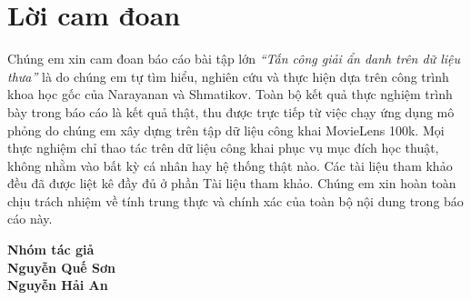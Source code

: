 \clearpage
{}
{}
\chapter*{Lời cam đoan}

Chúng em xin cam đoan báo cáo bài tập lớn \textit{``Tấn công giải ẩn danh trên dữ liệu thưa''} là do chúng em tự tìm hiểu, nghiên cứu và thực hiện dựa trên công trình khoa học gốc của Narayanan và Shmatikov. Toàn bộ kết quả thực nghiệm trình bày trong báo cáo là kết quả thật, thu được trực tiếp từ việc chạy ứng dụng mô phỏng do chúng em xây dựng trên tập dữ liệu công khai MovieLens 100k. Mọi thực nghiệm chỉ thao tác trên dữ liệu công khai phục vụ mục đích học thuật, không nhằm vào bất kỳ cá nhân hay hệ thống thật nào. Các tài liệu tham khảo đều đã được liệt kê đầy đủ ở phần Tài liệu tham khảo. Chúng em xin hoàn toàn chịu trách nhiệm về tính trung thực và chính xác của toàn bộ nội dung trong báo cáo này.

\vspace{1cm}

\hspace*{8.2cm}\begin{minipage}{6cm}
\centering
\textbf{Nhóm tác giả}\\[2.5cm]
\textbf{Nguyễn Quế Sơn}\\[6pt]
\textbf{Nguyễn Hải An}
\end{minipage}
